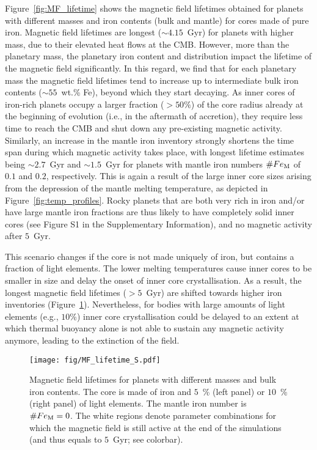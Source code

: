 \documentclass[draft]{agujournal2019} %
\begin{document}
Figure~\ref{fig:MF_lifetime} shows the magnetic field lifetimes obtained for planets with different masses and iron contents (bulk and mantle) for cores made of pure iron. Magnetic field lifetimes are longest ($\sim 4.15$~Gyr) for planets with higher mass, due to their elevated heat flows at the CMB. However, more than the planetary mass, the planetary iron content and distribution impact the lifetime of the magnetic field significantly. In this regard, we find that for each planetary mass the magnetic field lifetimes tend to increase up to intermediate bulk iron contents ($\sim 55$~wt.\% Fe), beyond which they start decaying. As inner cores of iron-rich planets occupy a larger fraction ($>50\%$) of the core radius already at the beginning of evolution (i.e., in the aftermath of accretion), they require less time to reach the CMB and shut down any pre-existing magnetic activity. Similarly, an increase in the mantle iron inventory strongly shortens the time span during which magnetic activity takes place, with longest lifetime estimates being $\sim 2.7$~Gyr and $\sim 1.5$~Gyr for planets with mantle iron numbers $\#Fe_{\rm M}$ of $0.1$ and $0.2$, respectively. This is again a result of the large inner core sizes arising from the depression of the mantle melting temperature, as depicted in Figure~\ref{fig:temp_profiles}. Rocky planets that are both very rich in iron and/or have large mantle iron fractions are thus likely to have completely solid inner cores (see Figure S1 in the Supplementary Information), and no magnetic activity after $5$~Gyr.

This scenario changes if the core is not made uniquely of iron, but contains a fraction of light elements. The lower melting temperatures cause inner cores to be smaller in size and delay the onset of inner core crystallisation. As a result, the longest magnetic field lifetimes ($> 5$~Gyr) are shifted towards higher iron inventories (Figure~\ref{fig:MF_lifetime_LE}). Nevertheless, for bodies with large amounts of light elements (e.g., $10$\%) inner core crystallisation could be delayed to an extent at which thermal buoyancy alone is not able to sustain any magnetic activity anymore, leading to the extinction of the field.

\begin{figure}
\texttt{[image: fig/MF\_lifetime\_S.pdf]}
\caption{Magnetic field lifetimes for planets with different masses and bulk iron contents. The core is made of iron and $5$~\% (left panel) or $10$~\% (right panel) of light elements. The mantle iron number is $\# Fe_{\rm M}=0$. The white regions denote parameter combinations for which the magnetic field is still active at the end of the simulations (and thus equals to $5$~Gyr; see colorbar).}
\label{fig:MF_lifetime_LE}
\end{figure}
\end{document}
